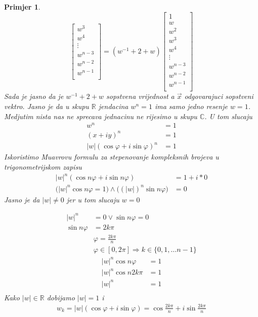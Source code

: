 \documentclass[11pt]{article}
\newtheorem{example}{Primjer}
\begin{document}
\begin{example}
\[\begin{bmatrix}
		w^3      \\
		w^4      \\
		\vdots   \\
		w^{n-3}  \\
		w^{n-2}  \\
		w^{n-1}  \\
		\end{bmatrix} 
	= 
	(w^{-1} + 2 + w)
		\begin{bmatrix}
		1      \\
		w        \\
		w^2      \\
		w^3      \\
		w^4      \\
		\vdots   \\
		w^{n-3}  \\
		w^{n-2}  \\
		w^{n-1}  \\
		\end{bmatrix}
	\]
	Sada je jasno da je $w^{-1} + 2 + w$ sopstvena vrijednost a $\vec{x}$ odgovarajuci sopstveni vektro.
	Jasno je da u skupu $\mathbb{R}$ jendacina $w^n = 1$ ima samo jedno resenje $w=1$. Medjutim nista nas ne sprecava 
    jednacinu ne rijesimo u skupu $\mathbb{C}$. U tom slucaju
	\[
	\begin{split}
	w^n  & = 1 \\
	(x + iy)^n & = 1 \\
	|w|(\cos\varphi + i \sin \varphi)^n & = 1
	\end{split}
	\]
	Iskoristimo Muavrovu formulu za stepenovanje kompleksnih brojeva u trigonometrijskom zapisu
	\[
		\begin{split}
			|w|^n (\cos n\varphi + i\sin n\varphi) & = 1 + i * 0 \\
			\big(|w|^n \cos n \varphi = 1 \big) \land \big((|w|)^n \sin n \varphi\big) & = 0  
		\end{split}
		\]
		Jasno je da $|w| \neq 0$ jer u tom slucaju $w=0$
	
	\[
	\begin{split}
		|w|^n  & = 0	\lor \sin n \varphi = 0 \\
		\sin n \varphi &= 2 k \pi \\
		&\varphi = \frac{2 k \pi}{n} \\
		& \varphi \in [0,2\pi] \Rightarrow k \in \{0,1, \dots n-1\}
	\end{split}
	\]
	\[
	\begin{split}
		|w|^n \cos n \varphi & = 1 \\
		|w|^n \cos n 2 k \pi & = 1 \\
		|w|^n  & = 1 \\
	\end{split}
	\]
	Kako $|w| \in \mathbb{R}$ dobijamo $|w|=1$ i
	\[
	\begin{split}
		w_k = |w| (\cos \varphi + i \sin \varphi) = \cos \frac{2 k \pi}{n} + i \sin \frac{2 k \pi}{n}
	\end{split}
	\]


\end{example}
\end{document}
